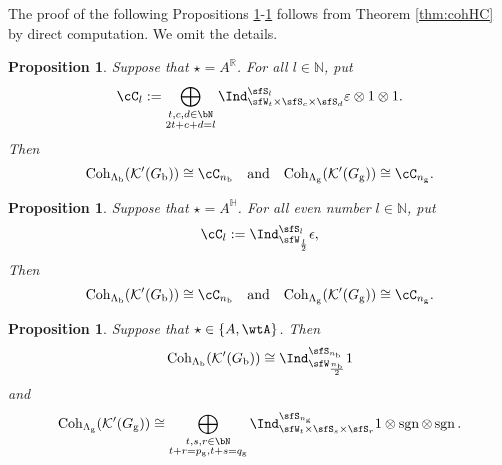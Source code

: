 \documentclass[12pt,a4paper]{amsart}
\newcommand{\BH}{{\mathbb {H}}}
\newcommand{\BN}{{\mathbb {N}}}
\newcommand{\CK}{{\mathcal {K}}}
\newcommand{\sgn}{\operatorname{sgn}}
\renewcommand{\t}{\mathfrak t}
\newcommand{\R}{\mathbb R}
\numberwithin{equation}{section}
\newtheorem{prop}[thm]{Proposition}
\theoremstyle{remark}
\def\ckG{\check{G}}
\def\dBV{d_{\mathrm{BV}}}
\def\YD{\mathsf{YD}}
\def\AND{\quad \text{and} \quad}
\def\Coh{\mathrm{Coh}}
\def\Spr{\mathrm{Springer}}
\begin{document}
  The proof of the following Propositions \ref{count000}-\ref{count002}  follows from Theorem \ref{thm:cohHC} by direct computation. We  omit the details.

   \begin{prop} \label{count000}
 Suppose that $\star=A^\R$.  For all $l\in \BN$, put
  \[
    \cC_l := \bigoplus_{\substack{t,c,d\in \bN \\2t+c+d=l}} \Ind_{\sfW_t\times \sfS_c\times \sfS_d}^{\sfS_{l}} \varepsilon \otimes 1\otimes 1.
  \]
  Then
  \[
    \Coh_{\Lambda_\mathrm b}(\CK'(G_\mathrm b)) \cong \cC_{n_{\mathrm b}}\quad\textrm{and}\quad   \Coh_{\Lambda_\mathrm g}(\CK'(G_\mathrm g)) \cong \cC_{n_{\mathrm g}}.
  \]
 \end{prop}


\begin{prop}\label{count001}
 Suppose that $\star=A^\BH$.    For all even number $l\in \BN$, put
  \[
  \cC_{l}: =
    \Ind_{\sfW_{\frac{l}{2}}}^{\sfS_{l}}\epsilon,
  \]
  Then \[
    \Coh_{\Lambda_\mathrm b}(\CK'(G_\mathrm b)) \cong \cC_{n_{\mathrm b}}\quad\textrm{and}\quad   \Coh_{\Lambda_\mathrm g}(\CK'(G_\mathrm g)) \cong \cC_{n_{\mathrm g}}.
   \]

\end{prop}



\begin{prop}\label{count002}
Suppose that $\star\in \{A, \wtA\}$.   Then
    \[
       \Coh_{\Lambda_\mathrm b}(\CK'(G_\mathrm b)) \cong  \Ind_{\sfW_{\frac{n_{\mathrm b}}{2}}}^{\sfS_{n_{\mathrm b}}} 1
    \]
    and
    \[
       \Coh_{\Lambda_\mathrm g}(\CK'(G_\mathrm g)) \cong  \bigoplus_{\substack{t,s,r\in \bN\\t+r=p_\mathrm g, t+s = q_\mathrm g}}
    \Ind_{\sfW_{t}\times \sfS_s\times \sfS_r}^{\sfS_{n_\mathrm g}}
 1\otimes \sgn \otimes \sgn.
    \]
    \end{prop}







\end{document}
